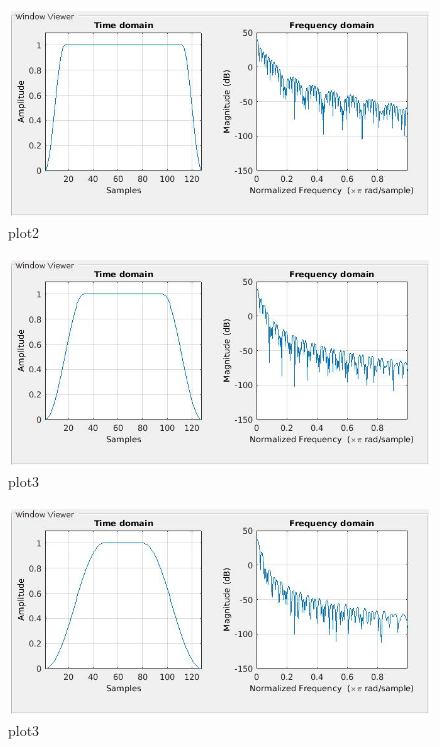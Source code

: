 \documentclass{article}
\begin{document}
\begin{figure}[h!]
    \centering
    \includegraphics[scale=0.4]{fig2.jpg}
    \caption{plot2}
    \label{fig:plot2}
\end{figure}

\begin{figure}[h!]
    \centering
    \includegraphics[scale=0.4]{fig3.jpg}
    \caption{plot3}
    \label{fig:plot3}
\end{figure}


\begin{figure}[h!]
    \centering
    \includegraphics[scale=0.4]{fig4.jpg}
    \caption{plot3}
    \label{fig:plot3}
\end{figure}
\end{document}
